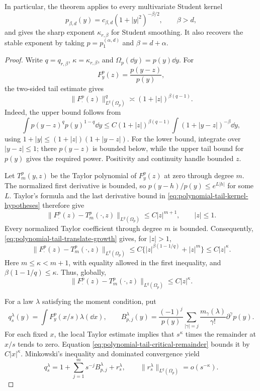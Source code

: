 \begin{theorem}
In particular, the theorem applies to every multivariate Student kernel
\[
 p_{\beta,d}(y)=c_{\beta,d}(1+|y|^2)^{-\beta/2},\qquad \beta>d,
\]
and gives the sharp exponent \(\kappa_{r,\beta}\) for Student smoothing.
It also recovers the stable exponent by taking \(p=p_1^{(\alpha,d)}\) and
\(\beta=d+\alpha\).
\end{theorem}

\begin{proof}
Write \(q=q_{r,\beta}\), \(\kappa=\kappa_{r,\beta}\), and
\(\Omega_p(\dd y)=p(y)\dd y\).  For
\[
 F_y^p(z)=\frac{p(y-z)}{p(y)},
\]
the two-sided tail estimate gives
\begin{equation}\label{eq:polynomial-tail-translate-growth}
 \|F_\cdot^p(z)\|_{L^q(\Omega_p)}^q
 \asymp(1+|z|)^{\beta(q-1)}.
\end{equation}
Indeed, the upper bound follows from
\[
 \int p(y-z)^qp(y)^{1-q}\dd y
 \le C(1+|z|)^{\beta(q-1)}
       \int(1+|y-z|)^{-\beta}\dd y,
\]
using \(1+|y|\le(1+|z|)(1+|y-z|)\).  For the lower bound, integrate over
\(|y-z|\le1\); there \(p(y-z)\) is bounded below, while the upper tail
bound for \(p(y)\) gives the required power.  Positivity and continuity
handle bounded \(z\).

Let \(T_m^p(y,z)\) be the Taylor polynomial of \(F_y^p(z)\) at zero
through degree \(m\).  The normalized first derivative is bounded, so
\(p(y-h)/p(y)\le e^{L|h|}\) for some \(L\).  Taylor's formula and the last
derivative bound in \eqref{eq:polynomial-tail-kernel-hypotheses} therefore
give
\[
 \|F_\cdot^p(z)-T_m^p(\cdot,z)\|_{L^q(\Omega_p)}
 \le C|z|^{m+1},\qquad |z|\le1.
\]
Every normalized Taylor coefficient through degree \(m\) is bounded.
Consequently, \eqref{eq:polynomial-tail-translate-growth} gives, for
\(|z|>1\),
\[
 \|F_\cdot^p(z)-T_m^p(\cdot,z)\|_{L^q(\Omega_p)}
 \le C\{|z|^{\beta(1-1/q)}+|z|^m\}
 \le C|z|^\kappa.
\]
Here \(m\le\kappa<m+1\), with equality allowed in the first inequality,
and \(\beta(1-1/q)\le\kappa\).  Thus, globally,
\begin{equation}\label{eq:polynomial-tail-critical-remainder}
 \|F_\cdot^p(z)-T_m^p(\cdot,z)\|_{L^q(\Omega_p)}
 \le C|z|^\kappa.
\end{equation}

For a law \(\lambda\) satisfying the moment condition, put
\[
 q_s^\lambda(y)=\int F_y^p(x/s)\lambda(\dd x),\qquad
 B_{p,j}^\lambda(y)
 =\frac{(-1)^j}{p(y)}
   \sum_{|\gamma|=j}\frac{m_\gamma(\lambda)}{\gamma!}
   \partial^\gamma p(y).
\]
For each fixed \(x\), the local Taylor estimate implies that \(s^\kappa\)
times the remainder at \(x/s\) tends to zero.  Equation
\eqref{eq:polynomial-tail-critical-remainder} bounds it by \(C|x|^\kappa\).
Minkowski's inequality and dominated convergence yield
\begin{equation}\label{eq:polynomial-tail-integrated-remainder}
 q_s^\lambda
 =1+\sum_{j=1}^ms^{-j}B_{p,j}^\lambda+r_s^\lambda,
 \qquad
 \|r_s^\lambda\|_{L^q(\Omega_p)}=o(s^{-\kappa}).
\end{equation}


\end{proof}
